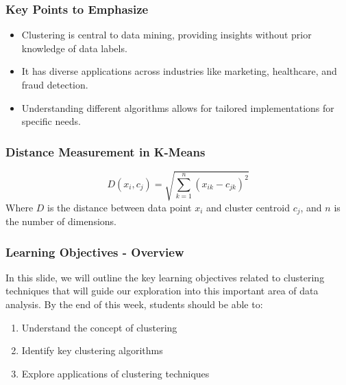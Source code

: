 \documentclass[aspectratio=169]{beamer}
\begin{document}
\begin{frame}[fragile]
    \frametitle{Key Points to Emphasize}
    \begin{itemize}
        \item Clustering is central to data mining, providing insights without prior knowledge of data labels.
        \item It has diverse applications across industries like marketing, healthcare, and fraud detection.
        \item Understanding different algorithms allows for tailored implementations for specific needs.
    \end{itemize}
\end{frame}

\begin{frame}[fragile]
    \frametitle{Distance Measurement in K-Means}
    \begin{equation}
        D(x_i, c_j) = \sqrt{\sum_{k = 1}^{n}(x_{ik} - c_{jk})^2}
    \end{equation}
    Where $D$ is the distance between data point $x_i$ and cluster centroid $c_j$, and $n$ is the number of dimensions.
\end{frame}

\begin{frame}[fragile]
    \frametitle{Learning Objectives - Overview}
    In this slide, we will outline the key learning objectives related to clustering techniques that will guide our exploration into this important area of data analysis. By the end of this week, students should be able to:
    \begin{enumerate}
        \item Understand the concept of clustering
        \item Identify key clustering algorithms
        \item Explore applications of clustering techniques
    \end{enumerate}
\end{frame}
\end{document}
